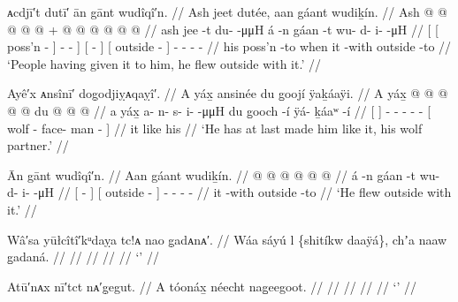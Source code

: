 
\ex\label{ex:301-5-}%
%
\begingl
	\glpreamble	ᴀcdjī′t dutī′ ān gānt wudîqî′n. //
	\glpreamble	Ash jeet dutée, aan gáant wudiḵín. //
	\gla	{} {} Ash  @ {} {}
			 @ {} @ {} @ {} @ {} {} +
		{}  @ {} {} {}  @ {} {}
		 @ {} @ {} @ {} @ {} //
	\glb	{} {} ash jee -t {}
			{} du-  -μμH {} {}
		{} á -n {} {} gáan -t {}
		wu- d- i-  -μH //
	\glc	{}[ {}[  poss’n - {}]
			\· -  - \· {}]
		{}[  - {}] {}[ outside - {}]
		- - -  - //
	\gld	{} {} his poss’n -to {}
			 {} {} {} \·when {}
		{} it -with {} {} outside -to {}
		 {} {} {} {} //
	\glft	‘People having given it to him, he flew outside with it.’
		//
\endgl
\xe

\ex\label{ex:301-6-}%
%
\begingl
	\glpreamble	Ayê′x ᴀnsînī′ dog̣odjiỵᴀqaỵî′. //
	\glpreamble	A yáx̱ ansinée du g̱oojí ÿaḵáaÿi. //
	\gla	{} A yáx̱ {}  @ {} @ {} @ {} @ {} @ {}
		{} du  @ {}  @ {} @ {} {} //
	\glb	{} a yáx̱ {} a- n- s- i-  -μμH
		{} du g̱ooch -í ÿá- ḵáaʷ -í {} //
	\glc	{}[   {}] - - - -  -
		{}[  wolf - face- man - {}] //
	\gld	{} it like {}  {} {} {} {} {}
		{} his  {}  {} {} {} //
	\glft	‘He has at last made him like it, his wolf partner.’
		//
\endgl
\xe


\ex\label{ex:301-7-}%
%
\begingl
	\glpreamble	Ān gānt wudîqî′n. //
	\glpreamble	Aan gáant wudiḵín. //
	\gla	{}  @ {} {} {}  @ {} {}
		 @ {} @ {} @ {} @ {} //
	\glb	{} á -n {} {} gáan -t {}
		wu- d- i-  -μH //
	\glc	{}[  - {}] {}[ outside - {}]
		- - -  - //
	\gld	{} it -with {} {} outside -to {}
		 {} {} {} {} //
	\glft	‘He flew outside with it.’
		//
\endgl
\xe

\ex\label{ex:301-8-}%
%
\begingl
	\glpreamble	Wâ′sa yūłcîtî′kᵘdaỵa tc!ᴀ nao g̣adᴀnᴀ′. //
	\glpreamble	Wáa sáyú l \{shitíkw daaÿá\}, chʼa naaw g̱adaná. //
	\gla	 //
	\glb	 //
	\glc	 //
	\gld	 //
	\glft	‘’
		//
\endgl
\xe

\ex\label{ex:301-9-}%
%
\begingl
	\glpreamble	Atū′nᴀx nī′tct nᴀ′g̣egut. //
	\glpreamble	A tóonáx̱ néecht nag̱eegoot. //
	\gla	 //
	\glb	 //
	\glc	 //
	\gld	 //
	\glft	‘’
		//
\endgl
\xe